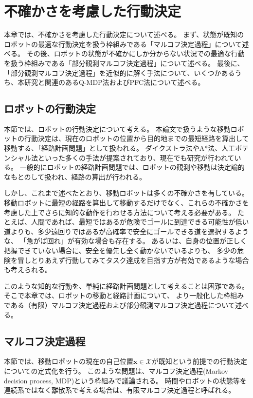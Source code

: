 \chapter{不確かさを考慮した行動決定} \label{chapter:pomdp}

本章では、不確かさを考慮した行動決定について述べる。
まず、状態が既知のロボットの最適な行動決定を扱う枠組みである「マルコフ決定過程」について述べる。
その後、ロボットの状態が不確かにしか分からない状況での最適な行動を扱う枠組みである「部分観測マルコフ決定過程」について述べる。
最後に、「部分観測マルコフ決定過程」を近似的に解く手法について、いくつかあるうち、本研究と関連のあるQ-MDP法およびPFC法について述べる。


\section{ロボットの行動決定}
本節では、ロボットの行動決定について考える。
本論文で扱うような移動ロボットの行動決定は、現在のロボットの位置から目的地までの最短経路を算出して移動する、「経路計画問題」として扱われる。
ダイクストラ法やA*法、人工ポテンシャル法といった多くの手法が提案されており、現在でも研究が行われている。
一般的にロボットの経路計画問題では、ロボットの観測や移動は決定論的なもとのして扱われ、経路の算出が行われる。

しかし、これまで述べたとおり、移動ロボットは多くの不確かさを有している。
移動ロボットに最短の経路を算出して移動するだけでなく、これらの不確かさを考慮した上でさらに知的な動作を行わせる方法について考える必要がある。
たとえば、人間であれば、最短ではあるが危険でゴールに到達できる可能性が低い道よりも、多少遠回りではあるが高確率で安全にゴールできる道を選択するような、
「急がば回れ」が有効な場合も存在する。
あるいは、自身の位置が正しく把握できていない場合に、安全を優先し全く動かないでいるよりも、
多少の危険を冒しとりあえず行動してみてタスク達成を目指す方が有効であるような場合も考えられる。

このような知的な行動を、単純に経路計画問題として考えることは困難である。
そこで本章では、ロボットの移動と経路計画について、
より一般化した枠組みである（有限）マルコフ決定過程および部分観測マルコフ決定過程について述べる。



\section{マルコフ決定過程} \label{section:mdp}
本節では、移動ロボットの現在の自己位置$\bm{x} \in \mathcal{X}$が既知という前提での行動決定についての定式化を行う。
このような問題は、マルコフ決定過程(Markov decision process, MDP)という枠組みで議論される。
時間やロボットの状態等を連続系ではなく離散系で考える場合は、有限マルコフ決定過程と呼ばれる。

